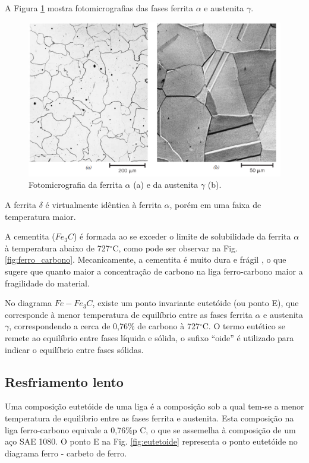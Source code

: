 \documentclass[
12pt,
openany, %
oneside, %
a4paper,			
english,			
brazil			        %
]{abntbibufjf}
\begin{document}
	A Figura \ref{fig:ferrita_austenita} mostra fotomicrografias das fases ferrita $\alpha$ e austenita $\gamma$.
	
	\begin{figure}[H]
		\centering
		\includegraphics[width=1\textwidth]{ferrita_austenita}
		\caption{Fotomicrografia da ferrita $\alpha$ (a) e da austenita $\gamma$ (b). \cite{callister2011materials}}
		\label{fig:ferrita_austenita}
	\end{figure}
	
	A ferrita $\delta$ é virtualmente idêntica à ferrita $\alpha$, porém em uma faixa de temperatura maior.
	
	A cementita ($Fe_3C$) é formada ao se exceder o limite de solubilidade da ferrita $\alpha$ à temperatura abaixo de 727$^{\circ}$C, como pode ser observar na Fig. \ref{fig:ferro_carbono}. Mecanicamente, a cementita é muito dura e frágil \cite{callister2011materials}, o que sugere que quanto maior a concentração de carbono na liga ferro-carbono maior a fragilidade do material.
	
	No diagrama $Fe-Fe_3C$, existe um ponto invariante eutetóide (ou ponto E), que corresponde à menor temperatura de equilíbrio entre as fases ferrita $\alpha$ e austenita $\gamma$, correspondendo a cerca de 0,76\% de carbono à 727$^{\circ}$C. O termo eutético se remete ao equilíbrio entre fases líquida e sólida, o sufixo ``oide'' é utilizado para indicar o equilíbrio entre fases sólidas.

\pagebreak

\subsection{Resfriamento lento}
	
	Uma composição eutetóide de uma liga é a composição sob a qual tem-se a menor temperatura de equilíbrio entre as fases ferrita e austenita. Esta composição na liga ferro-carbono equivale a 0,76\%p C, o que se assemelha à composição de um aço SAE 1080. O ponto E na Fig. \ref{fig:eutetoide} representa o ponto eutetóide no diagrama ferro - carbeto de ferro.
	
\end{document}
